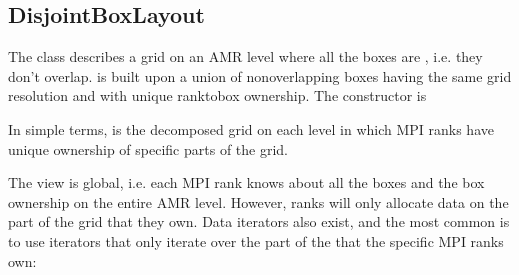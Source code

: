 \documentclass[letterpaper,10pt,english]{sphinxmanual}
\begin{document}
\subsection{DisjointBoxLayout}
\label{\detokenize{Source/ChomboBasics:disjointboxlayout}}
The  class describes a grid on an AMR level where all the boxes are , i.e. they don’t overlap.
 is built upon a union of non\sphinxhyphen{}overlapping boxes having the same grid resolution and with unique rank\sphinxhyphen{}to\sphinxhyphen{}box ownership.
The constructor is

\begin{sphinxVerbatim}[commandchars=\\\{\},formatcom=\scriptsize]
   
   

  
\end{sphinxVerbatim}

In simple terms,   is the decomposed grid on each level in which MPI ranks have unique ownership of specific parts of the grid.

The  view is global, i.e. each MPI rank knows about all the boxes and the box ownership on the entire AMR level.
However, ranks will only allocate data on the part of the grid that they own.
Data iterators also exist, and the most common is to use iterators that only iterate over the part of the  that the specific MPI ranks own:

\begin{sphinxVerbatim}[commandchars=\\\{\},formatcom=\scriptsize]
 
    
\end{sphinxVerbatim}
\end{document}
